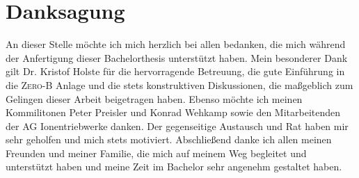 \chapter*{Danksagung}
An dieser Stelle möchte ich mich herzlich bei allen bedanken, die mich während der Anfertigung dieser Bachelorthesis unterstützt haben. Mein besonderer Dank gilt Dr. Kristof Holste für die hervorragende Betreuung, die gute Einführung in die \textsc{Zero-B} Anlage und die stets konstruktiven Diskussionen, die maßgeblich zum Gelingen dieser Arbeit beigetragen haben. Ebenso möchte ich meinen Kommilitonen Peter Preisler und Konrad Wehkamp sowie den Mitarbeitenden der AG Ionentriebwerke danken. Der gegenseitige Austausch und Rat haben mir sehr geholfen und mich stets motiviert. Abschließend danke ich allen meinen Freunden und meiner Familie, die mich auf meinem Weg begleitet und unterstützt haben und meine Zeit im Bachelor sehr angenehm gestaltet haben.